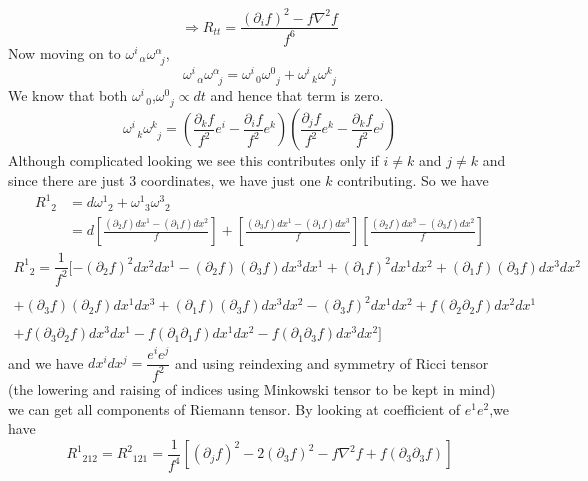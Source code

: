 ﻿\documentclass[12pt,a4paper]{article}
\begin{document}
$$
\Rightarrow R_{tt}=\frac{\left(\partial_{i} f\right)^{2}-f \nabla^{2} f}{f^{6}}
$$
Now moving on to $\omega_{\;\;\alpha}^{i} \omega^{\alpha}_{\;\;j}$,
$$
\omega_{\;\;\alpha}^{i} \omega^{\alpha}_{\;\;j}=\omega^{i}_{ \;\;0} \omega^{0}_{\;\;j} +\omega^{i}_{\;\;k} \omega^{k}_{\;\;j}
$$
We know that both $\omega^{i}_{ \;\;0}$,$\omega^{0}_{\;\;j} \propto dt$ and hence that term is zero.
$$\omega^{i}_{\;\;k} \omega^{k}_{\;\;j}=\left( \frac{\partial_{k} f}{f^{2}} e^{i}-\frac{\partial_{i} f}{f^{2}} e^{k}\right)\left( \frac{\partial_{j} f}{f^{2}} e^{k}-\frac{\partial_{k} f}{f^{2}} e^{j}\right)$$
Although complicated looking we see this contributes only if $i\neq k$ and $j\neq k$ and since there are just 3 coordinates, we have just one $k$ contributing. So we have 
$$
\begin{aligned}
R_{\;\;2}^{1}&=d \omega_{\;\;2}^{1}+\omega_{\;\;3}^{1} \omega^{3}_{\;\;2}\\
&=d\left[\frac{\left(\partial_{2} f\right) d x^{1}-\left(\partial_{1} f\right) d x^{2}}{f}\right]+\left[\frac{\left(\partial_{3} f\right) d x^{1}-\left(\partial_{1} f\right) d x^{3}}{f}\right]\left[\frac{\left(\partial_{2} f\right) d x^{3}-\left(\partial_{3} f\right) d x^{2}}{f}\right]
\end{aligned}
$$
$$
\begin{array}{r}
R_{\;\;2}^{1}=\dfrac{1}{f^{2}}[-(\partial_{2} f)^{2} d x^{2} d x^{1} -\left(\partial_{2} f\right)\left(\partial_{3} f\right) d x^{3} d x^{1} +(\partial_{1} f)^{2} d x^{1} d x^{2}+\left(\partial_{1} f\right)\left(\partial_{3} f\right) d x^{3} d x^{2} \\\\
+\left(\partial_{3} f\right)\left(\partial_{2} f\right) d x^{1} d x^{3}+\left(\partial_{1} f\right)\left(\partial_{3} f\right) d x^{3} d x^{2}-(\partial_{3} f)^{2} d x^{1} d x^{2}+f\left(\partial_{2} \partial_{2} f\right) d x^{2} d x^{1}\\\\
+f\left(\partial_{3} \partial_{2} f\right) d x^{3} d x^{1}-f\left(\partial_{1} \partial_{1} f\right) d x^{1} d x^{2}-f\left(\partial_{1} \partial_{3} f\right) d x^{3} d x^{2}]
\end{array}
$$
and we have $dx^{i}dx^{j}=\dfrac{e^{i}e^{j}}{f^{2}}$ and using reindexing and symmetry of Ricci tensor (the lowering and raising of indices using Minkowski tensor to be kept in mind) we can get all components of Riemann tensor. By looking at coefficient of $e^{1}e^{2}$,we have
$$
R_{\;\;212}^{1}=R_{\;\;121}^{2}=\frac{1}{f^{4}}\left[\left(\partial_{j} f\right)^{2}-2\left(\partial_{3} f\right)^{2}-f \nabla^{2} f+f\left(\partial_{3} \partial_{3} f\right)\right]
$$
\end{document}
